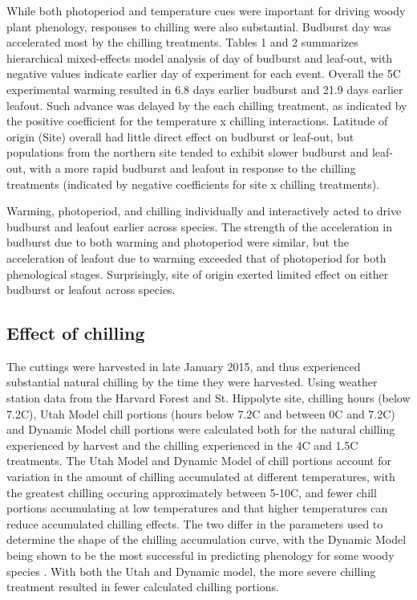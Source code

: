 \documentclass{article}
\begin{document}
While both photoperiod and temperature cues were important for driving woody plant phenology, responses to chilling were also substantial. Budburst day was accelerated most by the chilling treatments. Tables 1 and 2 summarizes hierarchical mixed-effects model analysis of day of budburst and leaf-out, with negative values indicate earlier day of experiment for each event. Overall the 5\degree C experimental warming resulted in 6.8 days earlier budburst and 21.9 days earlier leafout. Such advance was delayed by the each chilling treatment, as indicated by the positive coefficient for the temperature x chilling interactions. Latitude of origin (Site) overall had little direct effect on budburst or leaf-out, but populations from the northern site tended to exhibit slower budburst and leaf-out, with a more rapid budburst and leafout in response to the chilling treatments (indicated by negative coefficients for site x chilling treatments).

Warming, photoperiod, and chilling individually and interactively acted to drive budburst and leafout earlier across species. The strength of the acceleration in budburst due to both warming and photoperiod were similar, but the acceleration of leafout due to warming exceeded that of photoperiod for both phenological stages. Surprisingly, site of origin exerted limited effect on either budburst or leafout across species. 

\subsection*{Effect of chilling}
The cuttings were harvested in late January 2015, and thus experienced substantial natural chilling by the time they were harvested. Using weather station data from the Harvard Forest and St. Hippolyte site, chilling hours (below 7.2\degree C), Utah Model chill portions (hours below 7.2\degree C and between 0\degree C and 7.2\degree C) and Dynamic Model \cite{Erez:1988} chill portions were calculated both for the natural chilling experienced by harvest and the chilling experienced in the 4\degree C and 1.5\degree C treatments. The Utah Model and Dynamic Model of chill portions account for variation in the amount of chilling accumulated at different temperatures, with the greatest chilling occuring approximately between 5-10\degree C, and fewer chill portions accumulating at low temperatures and that higher temperatures can reduce accumulated chilling effects. The two differ in the parameters used to determine the shape of the chilling accumulation curve, with the Dynamic Model being shown to be the most successful in predicting phenology for some woody species \cite{Luedeling:2009}.
With both the Utah and Dynamic model, the more severe chilling treatment resulted in fewer calculated chilling portions. 
\end{document}
